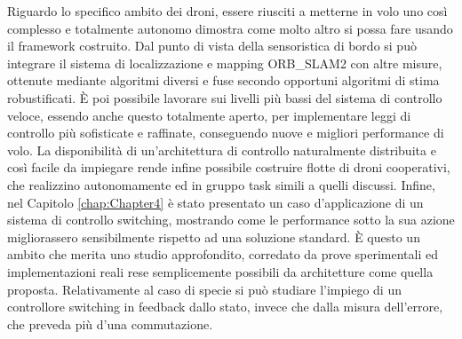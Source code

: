 Riguardo lo specifico ambito dei droni, essere riusciti a metterne in volo uno così complesso e totalmente autonomo dimostra come molto altro si possa fare usando il framework costruito. Dal punto di vista della sensoristica di bordo si può integrare il sistema di localizzazione e mapping ORB\_SLAM2 con altre misure, ottenute mediante algoritmi diversi e fuse secondo opportuni algoritmi di stima robustificati. È poi possibile lavorare sui livelli più bassi del sistema di controllo veloce, essendo anche questo totalmente aperto, per implementare leggi di controllo più sofisticate e raffinate, conseguendo nuove e migliori performance di volo. La disponibilità di un'architettura di controllo naturalmente distribuita e così facile da impiegare rende infine possibile costruire flotte di droni cooperativi, che realizzino autonomamente ed in gruppo task simili a quelli discussi. Infine, nel Capitolo \ref{chap:Chapter4} è stato presentato un caso d'applicazione di un sistema di controllo switching, mostrando come le performance sotto la sua azione migliorassero sensibilmente rispetto ad una soluzione standard. È questo un ambito che merita uno studio approfondito, corredato da prove sperimentali ed implementazioni reali rese semplicemente possibili da architetture come quella proposta. Relativamente al caso di specie si può studiare l'impiego di un controllore switching in feedback dallo stato, invece che dalla misura dell'errore, che preveda più d'una commutazione.
